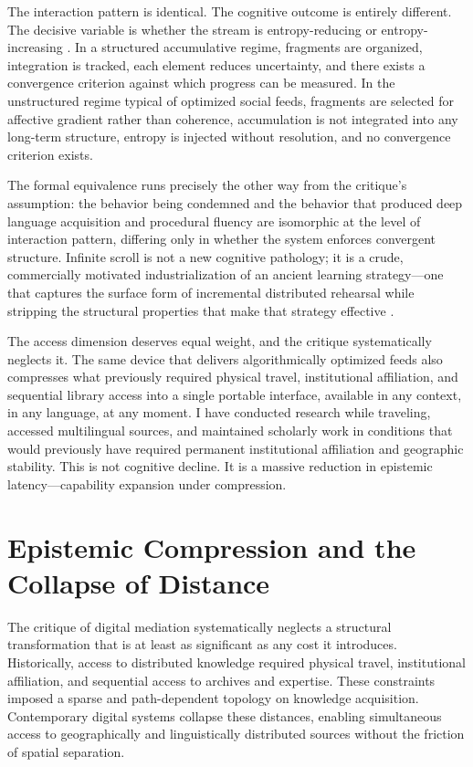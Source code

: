 \documentclass[12pt, a4paper]{article}
\begin{document}
The interaction pattern is identical. The cognitive outcome is entirely different. The decisive variable is whether the stream is entropy-reducing or entropy-increasing \cite{Shannon1948,Jaynes1957}. In a structured accumulative regime, fragments are organized, integration is tracked, each element reduces uncertainty, and there exists a convergence criterion against which progress can be measured. In the unstructured regime typical of optimized social feeds, fragments are selected for affective gradient rather than coherence, accumulation is not integrated into any long-term structure, entropy is injected without resolution, and no convergence criterion exists.

The formal equivalence runs precisely the other way from the critique's assumption: the behavior being condemned and the behavior that produced deep language acquisition and procedural fluency are isomorphic at the level of interaction pattern, differing only in whether the system enforces convergent structure. Infinite scroll is not a new cognitive pathology; it is a crude, commercially motivated industrialization of an ancient learning strategy---one that captures the surface form of incremental distributed rehearsal while stripping the structural properties that make that strategy effective \cite{Goodhart1975}.

The access dimension deserves equal weight, and the critique systematically neglects it. The same device that delivers algorithmically optimized feeds also compresses what previously required physical travel, institutional affiliation, and sequential library access into a single portable interface, available in any context, in any language, at any moment. I have conducted research while traveling, accessed multilingual sources, and maintained scholarly work in conditions that would previously have required permanent institutional affiliation and geographic stability. This is not cognitive decline. It is a massive reduction in epistemic latency---capability expansion under compression.

\section{Epistemic Compression and the Collapse of Distance}

The critique of digital mediation systematically neglects a structural transformation that is at least as significant as any cost it introduces. Historically, access to distributed knowledge required physical travel, institutional affiliation, and sequential access to archives and expertise. These constraints imposed a sparse and path-dependent topology on knowledge acquisition. Contemporary digital systems collapse these distances, enabling simultaneous access to geographically and linguistically distributed sources without the friction of spatial separation.
\end{document}

